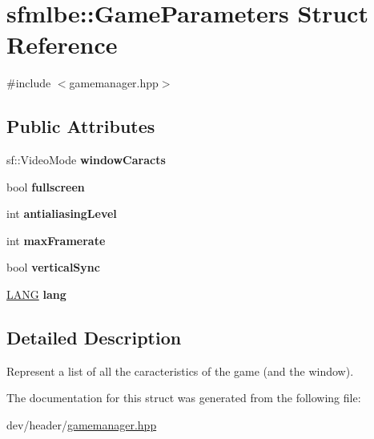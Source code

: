 \hypertarget{structsfmlbe_1_1_game_parameters}{}\section{sfmlbe\+:\+:Game\+Parameters Struct Reference}
\label{structsfmlbe_1_1_game_parameters}


{\ttfamily \#include $<$gamemanager.\+hpp$>$}

\subsection*{Public Attributes}
\begin{DoxyCompactItemize}
\item 
\mbox{\label{structsfmlbe_1_1_game_parameters_a274da1705f8a7d916bd1900b9aee41f4}} 
sf\+::\+Video\+Mode {\bfseries window\+Caracts}
\item 
\mbox{\label{structsfmlbe_1_1_game_parameters_ad3fe8d4c94d29472a1febcd44c1d0f74}} 
bool {\bfseries fullscreen}
\item 
\mbox{\label{structsfmlbe_1_1_game_parameters_a793aceb4455ae9a37c76d1fd25b85a31}} 
int {\bfseries antialiasing\+Level}
\item 
\mbox{\label{structsfmlbe_1_1_game_parameters_a810f73112b06b44864eda8aa8e84fd1c}} 
int {\bfseries max\+Framerate}
\item 
\mbox{\label{structsfmlbe_1_1_game_parameters_a773fe86edb38f13f2f9b4383968c55c8}} 
bool {\bfseries vertical\+Sync}
\item 
\mbox{\label{structsfmlbe_1_1_game_parameters_a771104f68f448f880216946eaf9bf013}} 
\mbox{\hyperlink{namespacesfmlbe_add7861f7feda29864e1760490cd2eb15}{L\+A\+NG}} {\bfseries lang}
\end{DoxyCompactItemize}


\subsection{Detailed Description}
Represent a list of all the caracteristics of the game (and the window). 

The documentation for this struct was generated from the following file\+:\begin{DoxyCompactItemize}
\item 
dev/header/\mbox{\hyperlink{gamemanager_8hpp}{gamemanager.\+hpp}}\end{DoxyCompactItemize}
